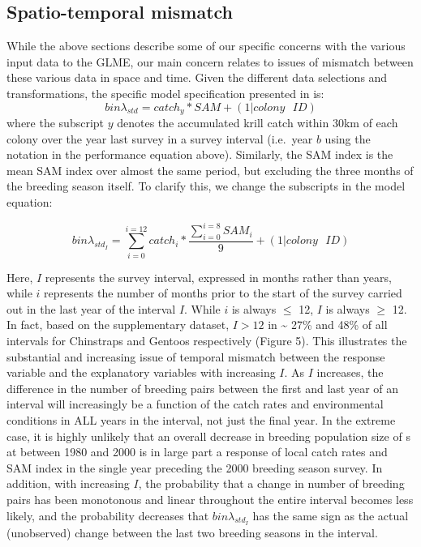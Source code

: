 \documentclass[]{elsarticle} %
\begin{document}
\subsection{Spatio-temporal mismatch}\label{spatio-temporal-mismatch}

While the above sections describe some of our specific concerns with the
various input data to the GLME, our main concern relates to issues of
mismatch between these various data in space and time. Given the
different data selections and transformations, the specific model
specification presented in \citet{Kruger2021} is:
\[bin\lambda_{std}=catch_y*SAM+(1|colony\text{ }ID)\] where the
subscript \(y\) denotes the accumulated krill catch within 30km of each
colony over the year last survey in a survey interval (i.e.~year \(b\)
using the notation in the performance equation above). Similarly, the
SAM index is the mean SAM index over almost the same period, but
excluding the three months of the breeding season itself. To clarify
this, we change the subscripts in the model equation:

\[bin\lambda_{std_I}=\sum_{i=0}^{i=12}{catch_i}*\frac{\sum_{i=0}^{i=8}{SAM_i}}{9}+(1|colony\text{ }ID)\]

Here, \(I\) represents the survey interval, expressed in months rather
than years, while \(i\) represents the number of months prior to the
start of the survey carried out in the last year of the interval \(I\).
While \(i\) is always \(\leqslant\) 12, \(I\) is always \(\geqslant\)
12. In fact, based on the \citet{Kruger2021} supplementary dataset,
\(I>12\) in \textasciitilde{} 27\% and 48\% of all intervals for
Chinstraps and Gentoos respectively (Figure 5). This illustrates the
substantial and increasing issue of temporal mismatch between the
response variable and the explanatory variables with increasing \(I\).
As \(I\) increases, the difference in the number of breeding pairs
between the first and last year of an interval will increasingly be a
function of the catch rates and environmental conditions in ALL years in
the interval, not just the final year. In the extreme case, it is highly
unlikely that an overall decrease in breeding population size of s at
between 1980 and 2000 is in large part a response of local catch rates
and SAM index in the single year preceding the 2000 breeding season
survey. In addition, with increasing \(I\), the probability that a
change in number of breeding pairs has been monotonous and linear
throughout the entire interval becomes less likely, and the probability
decreases that \(bin\lambda_{std_I}\) has the same sign as the actual
(unobserved) change between the last two breeding seasons in the
interval.
\end{document}
